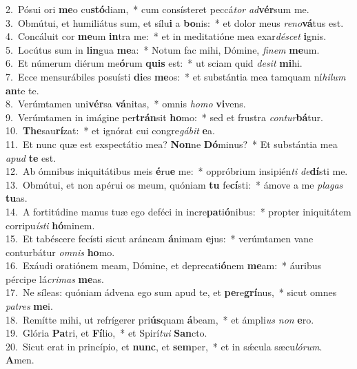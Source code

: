 {2.~}Pósui ori \textbf{me}o cu\textbf{stó}diam,~* cum consísteret peccá\textit{tor} \textit{ad}\textbf{vér}sum me.\\
{3.~}Obmútui, et humiliátus sum, et sílu\textbf{i} a \textbf{bo}nis:~* et dolor meus \textit{re}\textit{no}\textbf{vá}tus est.\\
{4.~}Concáluit cor \textbf{me}um \textbf{in}tra me:~* et in meditatióne mea exar\textit{dé}\textit{scet} \textbf{i}gnis.\\
{5.~}Locútus sum in \textbf{lin}gua \textbf{me}a:~* Notum fac mihi, Dómine, \textit{fi}\textit{nem} \textbf{me}um.\\
{6.~}Et númerum diérum me\textbf{ó}rum \textbf{quis} est:~* ut sciam quid \textit{de}\textit{sit} \textbf{mi}hi.\\
{7.~}Ecce mensurábiles posuísti \textbf{di}es \textbf{me}os:~* et substántia mea tamquam ní\textit{hi}\textit{lum} \textbf{an}te te.\\
{8.~}Verúmtamen uni\textbf{vér}sa \textbf{vá}nitas,~* omnis \textit{ho}\textit{mo} \textbf{vi}vens.\\
{9.~}Verúmtamen in imágine per\textbf{trán}sit \textbf{ho}mo:~* sed et frustra \textit{con}\textit{tur}\textbf{bá}tur.\\
{10.~}\textbf{The}sau\textbf{rí}zat:~* et ignórat cui congre\textit{gá}\textit{bit} \textbf{e}a.\\
{11.~}Et nunc quæ est exspectátio mea? \textbf{Non}ne \textbf{Dó}minus?~* Et substántia mea \textit{a}\textit{pud} \textbf{te} est.\\
{12.~}Ab ómnibus iniquitátibus meis \textbf{é}ru\textbf{e} me:~* oppróbrium insipién\textit{ti} \textit{de}\textbf{dí}sti me.\\
{13.~}Obmútui, et non apérui os meum, quóniam \textbf{tu} fe\textbf{cí}sti:~* ámove a me \textit{pla}\textit{gas} \textbf{tu}as.\\
{14.~}A fortitúdine manus tuæ ego deféci in incre\textbf{pa}ti\textbf{ó}nibus:~* propter iniquitátem corripu\textit{í}\textit{sti} \textbf{hó}minem.\\
{15.~}Et tabéscere fecísti sicut aráneam \textbf{á}nimam \textbf{e}jus:~* verúmtamen vane conturbátur \textit{om}\textit{nis} \textbf{ho}mo.\\
{16.~}Exáudi oratiónem meam, Dómine, et deprecati\textbf{ó}nem \textbf{me}am:~* áuribus pércipe lá\textit{cri}\textit{mas} \textbf{me}as.\\
{17.~}Ne síleas: quóniam ádvena ego sum apud te, et \textbf{pe}re\textbf{grí}nus,~* sicut omnes \textit{pa}\textit{tres} \textbf{me}i.\\
{18.~}Remítte mihi, ut refrígerer pri\textbf{ús}quam \textbf{á}beam,~* et ámpli\textit{us} \textit{non} \textbf{e}ro.\\
{19.~}Glória \textbf{Pa}tri, et \textbf{Fí}lio,~* et Spirí\textit{tu}\textit{i} \textbf{San}cto.\\
{20.~}Sicut erat in princípio, et \textbf{nunc}, et \textbf{sem}per,~* et in sǽcula sæcu\textit{ló}\textit{rum}. \textbf{A}men.\\
